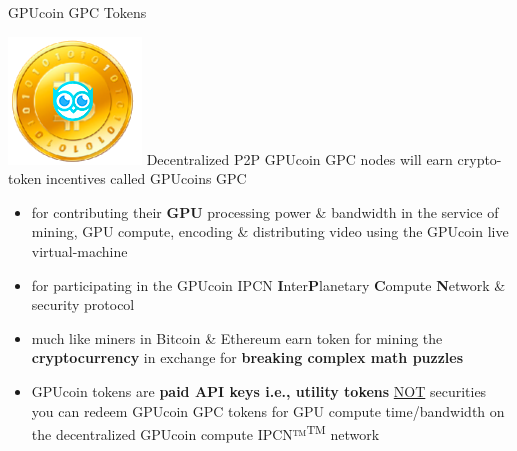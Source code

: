 
\begin{frame}[t]{GPUcoin GPC Tokens }
 
\includegraphics[scale=0.2]{static/hootcoin} Decentralized P2P	 GPUcoin GPC nodes will earn crypto-token incentives called GPUcoins GPC

 \begin{itemize}[<+-| alert@+>]
 \item for contributing their \textbf{GPU} processing power \& bandwidth in the service of mining, GPU compute, encoding \& distributing video using the GPUcoin live virtual-machine 
 \item for participating in the GPUcoin IPCN \textbf{I}nter\textbf{P}lanetary \textbf{C}ompute \textbf{N}etwork \& security protocol
 \item much like miners in Bitcoin \& Ethereum earn token for mining the \textbf{cryptocurrency} in exchange for \textbf{breaking complex math puzzles}
 \item GPUcoin tokens are \textbf{paid API keys i.e., utility tokens} \underline{NOT} securities you can redeem GPUcoin GPC  tokens for GPU compute time/bandwidth on the decentralized GPUcoin compute IPCN™\textsuperscript{TM}  network
 \end{itemize}
 
\end{frame}